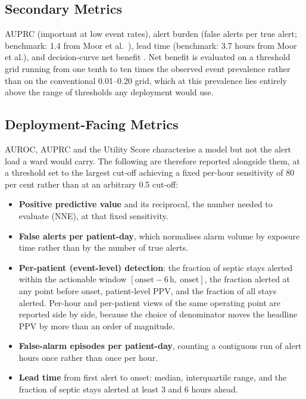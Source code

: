 \subsection{Secondary Metrics}

AUPRC (important at low event rates), alert burden (false alerts per true alert;
benchmark: 1.4 from Moor et al.\ \cite{moor2023review}), lead time
(benchmark: 3.7 hours from Moor et al.), and decision-curve net benefit
\cite{vickers2006dca}. Net benefit is evaluated on a threshold grid running
from one tenth to ten times the observed event prevalence rather than on the
conventional 0.01--0.20 grid, which at this prevalence lies entirely above the
range of thresholds any deployment would use.

\subsection{Deployment-Facing Metrics}
\label{sec:deployment_metrics}

AUROC, AUPRC and the Utility Score characterise a model but not the alert load
a ward would carry. The following are therefore reported alongside them, at a
threshold set to the largest cut-off achieving a fixed per-hour sensitivity of
80 per cent rather than at an arbitrary 0.5 cut-off:

\begin{itemize}
    \item \textbf{Positive predictive value} and its reciprocal, the number
    needed to evaluate (NNE), at that fixed sensitivity.
    \item \textbf{False alerts per patient-day}, which normalises alarm volume
    by exposure time rather than by the number of true alerts.
    \item \textbf{Per-patient (event-level) detection}: the fraction of septic
    stays alerted within the actionable window
    $[\text{onset}-6\,\text{h},\ \text{onset}]$, the fraction alerted at any
    point before onset, patient-level PPV, and the fraction of all stays
    alerted. Per-hour and per-patient views of the same operating point are
    reported side by side, because the choice of denominator moves the headline
    PPV by more than an order of magnitude.
    \item \textbf{False-alarm episodes per patient-day}, counting a contiguous
    run of alert hours once rather than once per hour.
    \item \textbf{Lead time} from first alert to onset: median, interquartile
    range, and the fraction of septic stays alerted at least 3 and 6 hours
    ahead.
\end{itemize}

